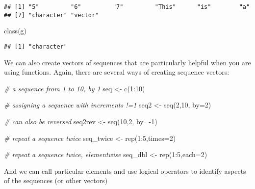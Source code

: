 \documentclass[
]{article}
\newenvironment{Shaded}{\begin{snugshade}}{\end{snugshade}}
\newcommand{\AttributeTok}[1]{\textcolor[rgb]{0.77,0.63,0.00}{#1}}
\newcommand{\CommentTok}[1]{\textcolor[rgb]{0.56,0.35,0.01}{\textit{#1}}}
\newcommand{\DecValTok}[1]{\textcolor[rgb]{0.00,0.00,0.81}{#1}}
\newcommand{\FunctionTok}[1]{\textcolor[rgb]{0.00,0.00,0.00}{#1}}
\newcommand{\NormalTok}[1]{#1}
\newcommand{\OtherTok}[1]{\textcolor[rgb]{0.56,0.35,0.01}{#1}}
\newcommand{\SpecialCharTok}[1]{\textcolor[rgb]{0.00,0.00,0.00}{#1}}
\begin{document}
\begin{verbatim}
## [1] "5"         "6"         "7"         "This"      "is"        "a"        
## [7] "character" "vector"
\end{verbatim}

\begin{Shaded}
\begin{Highlighting}[]
\FunctionTok{class}\NormalTok{(g)            }
\end{Highlighting}
\end{Shaded}

\begin{verbatim}
## [1] "character"
\end{verbatim}

We can also create vectors of sequences that are particularly helpful
when you are using functions. Again, there are several ways of creating
sequence vectors:

\begin{Shaded}
\begin{Highlighting}[]
\CommentTok{\# a sequence from 1 to 10, by 1}
\NormalTok{seq }\OtherTok{\textless{}{-}} \FunctionTok{c}\NormalTok{(}\DecValTok{1}\SpecialCharTok{:}\DecValTok{10}\NormalTok{)}

\CommentTok{\# assigning a sequence with increments !=1}
\NormalTok{seq2 }\OtherTok{\textless{}{-}} \FunctionTok{seq}\NormalTok{(}\DecValTok{2}\NormalTok{,}\DecValTok{10}\NormalTok{, }\AttributeTok{by=}\DecValTok{2}\NormalTok{)     }

\CommentTok{\# can also be reversed}
\NormalTok{seq2rev }\OtherTok{\textless{}{-}} \FunctionTok{seq}\NormalTok{(}\DecValTok{10}\NormalTok{,}\DecValTok{2}\NormalTok{, }\AttributeTok{by=}\SpecialCharTok{{-}}\DecValTok{1}\NormalTok{) }

\CommentTok{\# repeat a sequence twice}
\NormalTok{seq\_twice }\OtherTok{\textless{}{-}} \FunctionTok{rep}\NormalTok{(}\DecValTok{1}\SpecialCharTok{:}\DecValTok{5}\NormalTok{,}\AttributeTok{times=}\DecValTok{2}\NormalTok{)   }

\CommentTok{\# repeat a sequence twice, elementwise}
\NormalTok{seq\_dbl }\OtherTok{\textless{}{-}} \FunctionTok{rep}\NormalTok{(}\DecValTok{1}\SpecialCharTok{:}\DecValTok{5}\NormalTok{,}\AttributeTok{each=}\DecValTok{2}\NormalTok{)  }
\end{Highlighting}
\end{Shaded}

And we can call particular elements and use logical operators to
identify aspects of the sequences (or other vectors)
\end{document}
